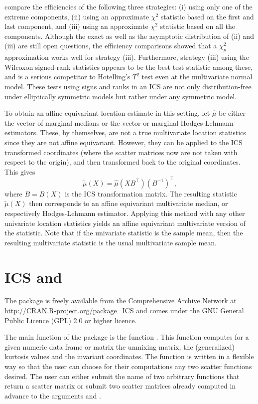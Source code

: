 \documentclass[article,nojss]{jss}
\begin{document}
\citet{NordhausenOjaTyler2006} compare the efficiencies of the following three strategies: (i) using only one of the
extreme components, (ii) using an approximate $\chi^2$ statistic based on the first and last component, and (iii) using an
approximate $\chi^2$ statistic based on all the components.
Although the exact as well as the asymptotic distribution of (ii) and (iii) are still open questions, the efficiency comparisons
showed that a $\chi^{2}_{p}$ approximation works well for strategy (iii). Furthermore, strategy (iii) using the Wilcoxon signed-rank
statistics appears to be the best test statistic among these, and is a serious competitor to Hotelling's $T^2$ test even at
the multivariate normal model. These tests using signs and ranks in an ICS are not only distribution-free under elliptically symmetric
models but rather under any symmetric model.

To obtain an affine equivariant location estimate in this setting, let $\hat\mu$ be either the vector of marginal medians or
the vector or marginal Hodges-Lehmann estimators. These, by themselves, are not a true multivariate location statistics
since they are not affine equivariant. However, they can be applied to the {ICS} transformed coordinates (where
the scatter matrices now are not taken with respect to the origin), and then transformed back to the original coordinates.
This gives
\[
\tilde{\mu}(X)=\hat\mu(XB^\top)(B^{-1})^\top,
\]
where $B=B(X)$ is the {ICS} transformation matrix. The resulting statistic $\tilde{\mu}(X)$ then corresponds to
an affine equivariant multivariate median, or respectively Hodges-Lehmann estimator. Applying this method with
any other univariate location statistics yields an affine equivariant multivariate version of the statistic.
Note that if the univariate statistic is the sample mean, then the resulting multivariate statistic is the
usual multivariate sample mean.


\section[ICS and R]{ICS and }\label{Rpack}

The package  is freely available from the Comprehensive  Archive Network
at \url{http://CRAN.R-project.org/package=ICS}
and comes under the GNU General Public Licence (GPL) 2.0 or higher licence.

The main function of the package  is the function . This function computes for a given numeric data frame or matrix the unmixing matrix, the (generalized) kurtosis
values and the invariant coordinates. The function is written in a flexible way so that the user can choose for their computations any two scatter functions desired. The user can either submit the
name of two arbitrary functions that return a scatter matrix or submit two scatter matrices already computed in advance to the arguments  and
.
\end{document}
